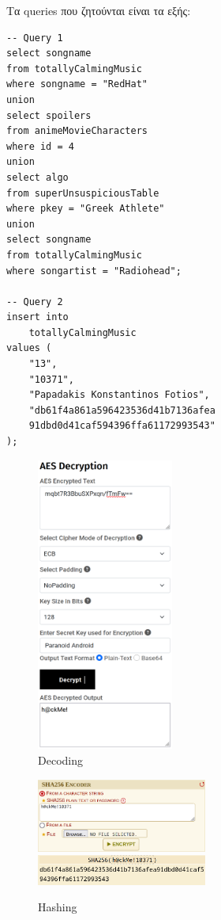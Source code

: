 \documentclass[twocolumn]{report}
\begin{document}
Τα queries που ζητούνται είναι τα εξής:
\begin{lstlisting}
-- Query 1
select songname
from totallyCalmingMusic
where songname = "RedHat"
union
select spoilers
from animeMovieCharacters
where id = 4
union
select algo
from superUnsuspiciousTable
where pkey = "Greek Athlete"
union 
select songname
from totallyCalmingMusic
where songartist = "Radiohead";

-- Query 2
insert into 
    totallyCalmingMusic 
values (
    "13",
    "10371", 
    "Papadakis Konstantinos Fotios", 
    "db61f4a861a596423536d41b7136afea
    91dbd0d41caf594396ffa61172993543"
);
\end{lstlisting}

\begin{figure}[H]
    \centering
    \includegraphics[width=0.4\textwidth]{aes.png}
    \caption{Decoding}
\end{figure}
\begin{figure}[H]
    \centering
    \includegraphics[width=0.5\textwidth]{encode.png}
    \includegraphics[width=0.5\textwidth]{hashed_password.png}
    \caption{Hashing}
\end{figure}

\end{document}
